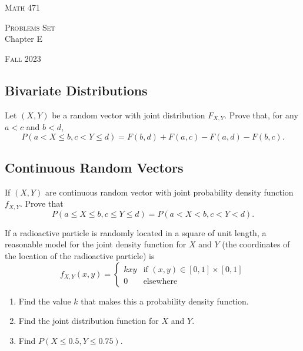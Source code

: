 


\hrulefill

\begin{minipage}{0.33\textwidth}
\textsc{Math 471}
\end{minipage} \hfill 
\begin{minipage}{0.32\textwidth}
\centering
\textsc{Problems Set} \\
Chapter E
\end{minipage}
 \hfill 
 \begin{minipage}{0.33\textwidth}
 \flushright \textsc{Fall 2023}
 \end{minipage}

\hrulefill

\setcounter{section}{5}

\subsection{Bivariate Distributions}

\begin{problem}
Let $(X, Y)$ be a random vector with joint distribution $F_{X, Y}$. Prove that, for any $a < c$ and $b < d$,
    \[
        P (a < X \leq b , c < Y \leq d ) = F(b, d) + F(a, c) - F (a, d) - F(b, c) .
    \]
\end{problem}

\subsection{Continuous Random Vectors}

\begin{problem}
If $(X, Y)$ are continuous random vector with joint probability density function $f_{X, Y}$. Prove that
    \[
        P (a \leq X \leq b , c \leq Y \leq d ) = P (a < X < b , c < Y < d) .
    \]
\end{problem}

\begin{problem}
If a radioactive particle is randomly located in a square of unit length, a reasonable model for the joint density function for $X$ and $Y$ (the coordinates of the location of the radioactive particle) is
    \[
        f_{X, Y} (x, y) = \left\lbrace \begin{matrix} k x y & \text{if } (x, y) \in [0, 1] \times [0, 1] \\
        0 & \text{elsewhere} \end{matrix} \right. 
    \]
\begin{enumerate}[label=\alph*)]
\item Find the value $k$ that makes this a probability density function.
\item Find the joint distribution function for $X$ and $Y$.
\item Find $P (X \leq 0.5 , Y \leq 0.75)$.
\end{enumerate}
\end{problem}

